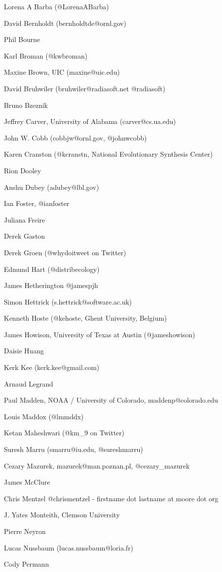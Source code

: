 \documentclass[11pt, oneside]{amsart}
\begin{document}
Lorena A Barba (@LorenaABarba)

David Bernholdt (bernholdtde@ornl.gov)

Phil Bourne

Karl Broman (@kwbroman)

Maxine Brown, UIC (maxine@uic.edu)

David Bruhwiler   (bruhwiler@radiasoft.net    @radiasoft)

Bruno Bzeznik

Jeffrey Carver, University of Alabama (carver@cs.ua.edu)

John W. Cobb (cobbjw@ornl.gov, @johnwcobb)

Karen Cranston (@kcranstn, National Evolutionary Synthesis Center)

Rion Dooley

Anshu Dubey (adubey@lbl.gov)

Ian Foster, @ianfoster

Juliana Freire

Derek Gaston

Derek Groen (@whydoitweet on Twitter)

Edmund Hart (@distribecology)

James Hetherington @jamespjh

Simon Hettrick (s.hettrick@software.ac.uk)

Kenneth Hoste (@kehoste, Ghent University, Belgium)

James Howison, University of Texas at Austin (@jameshowison)

Daisie Huang

Kerk Kee (kerk.kee@gmail.com)

Arnaud Legrand

Paul Madden, NOAA / University of Colorado, maddenp@colorado.edu

Louis Maddox (@lmmddx)

Ketan Maheshwari (@km\_9 on Twitter)

Suresh Marru (smarru@iu.edu, @sureshmarru) 

Cezary Mazurek, mazurek@man.poznan.pl, @cezary\_mazurek

James McClure

Chris Mentzel @chrismentzel - firstname dot lastname at moore dot org

J. Yates Monteith, Clemson University

Pierre Neyron

Lucas Nussbaum (lucas.nussbaum@loria.fr)

Cody Permann
\end{document}
